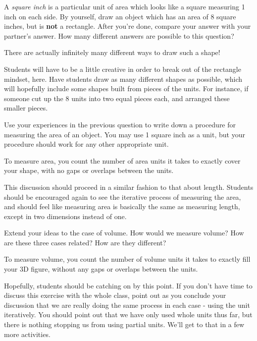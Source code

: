 \documentclass[handout]{ximera}
\begin{document}
\begin{problem}
A {\it square inch} is a particular unit of area which looks like a square measuring 1 inch on each side.  By yourself, draw an object which has an area of 8 square inches, but is {\bf not} a rectangle.  After you're done, compare your answer with your partner's answer.  How many different answers are possible to this question?

\begin{solution}    
There are actually infinitely many different ways to draw such a shape!
\end{solution}
\begin{instructorNotes}
Students will have to be a little creative in order to break out of the rectangle mindset, here.  Have students draw as many different shapes as possible, which will hopefully include some shapes built from pieces of the units.  For instance, if someone cut up the 8 units into two equal pieces each, and arranged these smaller pieces.
\end{instructorNotes}
\end{problem}

\begin{problem}
Use your experiences in the previous question to write down a procedure for measuring the area of an object.  You may use 1 square inch as a unit, but your procedure should work for any other appropriate unit.  

\begin{solution}
To measure area, you count the number of area units it takes to exactly cover your shape, with no gaps or overlaps between the units.
\end{solution}
\begin{instructorNotes}
This discussion should proceed in a similar fashion to that about length.  Students should be encouraged again to see the iterative process of measuring the area, and should feel like measuring area is basically the same as measuring length, except in two dimensions instead of one.
\end{instructorNotes}
\end{problem}

\begin{problem}
Extend your ideas to the case of volume.  How would we measure volume?  How are these three cases related?  How are they different?

\begin{solution}
To measure volume, you count the number of volume units it takes to exactly fill your 3D figure, without any gaps or overlaps between the units.
\end{solution}
\begin{instructorNotes}
Hopefully, students should be catching on by this point.  If you don't have time to discuss this exercise with the whole class, point out as you conclude your discussion that we are really doing the same process in each case - using the unit iteratively.  You should point out that we have only used whole units thus far, but there is nothing stopping us from using partial units.  We'll get to that in a few more activities.
\end{instructorNotes}
\end{problem}
\end{document}
